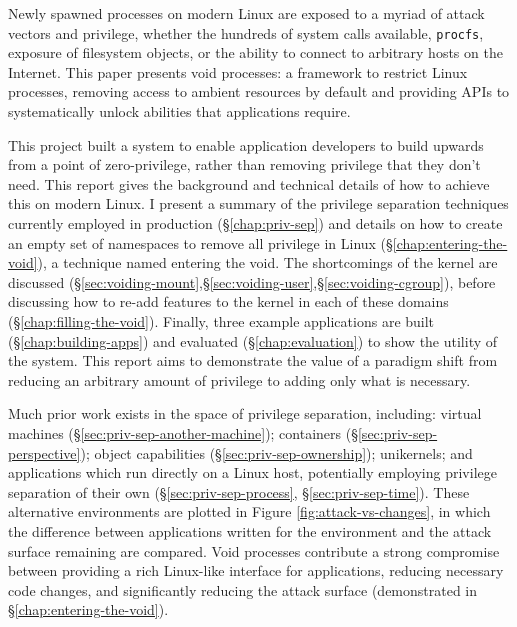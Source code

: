 \documentclass[12pt,a4paper,twoside]{report}
\begin{document}
Newly spawned processes on modern Linux are exposed to a myriad of attack vectors and privilege, whether the hundreds of system calls available, \texttt{procfs}, exposure of filesystem objects, or the ability to connect to arbitrary hosts on the Internet. This paper presents void processes: a framework to restrict Linux processes, removing access to ambient resources by default and providing APIs to systematically unlock abilities that applications require.


This project built a system to enable application developers to build upwards from a point of zero-privilege, rather than removing privilege that they don't need. This report gives the background and technical details of how to achieve this on modern Linux. I present a summary of the privilege separation techniques currently employed in production (§\ref{chap:priv-sep}) and details on how to create an empty set of namespaces to remove all privilege in Linux (§\ref{chap:entering-the-void}), a technique named entering the void. The shortcomings of the kernel are discussed (§\ref{sec:voiding-mount},§\ref{sec:voiding-user},§\ref{sec:voiding-cgroup}), before discussing how to re-add features to the kernel in each of these domains (§\ref{chap:filling-the-void}). Finally, three example applications are built (§\ref{chap:building-apps}) and evaluated (§\ref{chap:evaluation}) to show the utility of the system. This report aims to demonstrate the value of a paradigm shift from reducing an arbitrary amount of privilege to adding only what is necessary.

Much prior work exists in the space of privilege separation, including: virtual machines (§\ref{sec:priv-sep-another-machine}); containers (§\ref{sec:priv-sep-perspective}); object capabilities (§\ref{sec:priv-sep-ownership}); unikernels; and applications which run directly on a Linux host, potentially employing privilege separation of their own (§\ref{sec:priv-sep-process}, §\ref{sec:priv-sep-time}). These alternative environments are plotted in Figure \ref{fig:attack-vs-changes}, in which the difference between applications written for the environment and the attack surface remaining are compared. Void processes contribute a strong compromise between providing a rich Linux-like interface for applications, reducing necessary code changes, and significantly reducing the attack surface (demonstrated in §\ref{chap:entering-the-void}).
\end{document}
